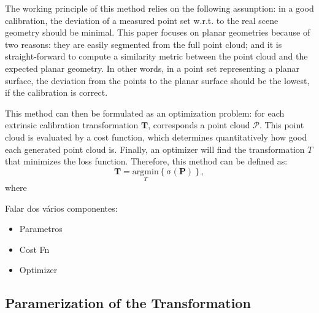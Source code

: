 \documentclass[conference]{IEEEtran}
\begin{document}
The working principle of this method relies on the following assunption: in a good calibration, the deviation of a measured point set w.r.t. to the real scene geometry should be minimal. This paper focuses on planar geometries because of two reasons:  they are easily segmented from the full point cloud; and it is straight-forward to compute a similarity metric between the point cloud and the expected planar geometry. In other words, in a point set representing a planar surface, the deviation from the points to the planar surface should be the lowest, if the calibration is correct.

This method can then be formulated as an optimization problem: for each extrinsic calibration transformation $\mathbf{T}$, corresponds a point cloud $\mathcal{P}$. This point cloud is evaluated by a cost function, which determines quantitatively how good each generated point cloud is. Finally, an optimizer will find the transformation $T$ that minimizes the loss function. Therefore, this method can be defined as:
%
\begin{equation}
    \mathbf{T} = \underset{T}{\mathrm{argmin}} \left\{ \mathrm{\sigma}(\textbf{P}) \right\},
\end{equation}
%
\noindent where %



Falar dos vários componentes:

\begin{itemize}
    \item Parametros
    \item Cost Fn
    \item Optimizer
\end{itemize}

\subsection{Paramerization of the Transformation}
\end{document}

